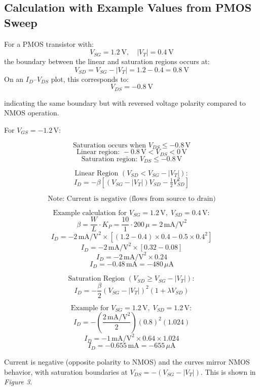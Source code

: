 \documentclass[a4paper,12pt]{article}
\begin{document}
\subsection*{Calculation with Example Values from PMOS Sweep}
For a PMOS transistor with:
\[
V_{SG} = 1.2~\text{V}, \quad |V_T| = 0.4~\text{V}
\]
the boundary between the linear and saturation regions occurs at:
\[
V_{SD} = V_{SG} - |V_T| = 1.2 - 0.4 = 0.8~\text{V}
\]
On an $I_D$--$V_{DS}$ plot, this corresponds to:
\[
V_{DS} = -0.8~\text{V}
\]

indicating the same boundary but with reversed voltage polarity compared to NMOS operation.

For \( V_{GS} = -1.2\,\text{V} \):

\[
\text{Saturation occurs when } V_{DS} \le -0.8\,\text{V}
\]
\[
\text{Linear region: } -0.8\,\text{V} < V_{DS} < 0\,\text{V}
\]
\[
\text{Saturation region: } V_{DS} \le -0.8\,\text{V}
\]

\[
\text{Linear Region } (V_{SD} < V_{SG} - |V_T|):
\]
\[
I_D = -\beta\left[(V_{SG} - |V_T|)V_{SD} - \tfrac{1}{2}V_{SD}^2\right]
\]

\[
\text{Note: Current is negative (flows from source to drain)}
\]

\[
\text{Example calculation for } V_{SG} = 1.2\,\text{V}, \; V_{SD} = 0.4\,\text{V}:
\]
\[
\beta = \frac{W}{L} \cdot K_P = \frac{10}{1} \cdot 200\,\mu = 2\,\text{mA/V}^2
\]
\[
I_D = -2\,\text{mA/V}^2 \times \left[(1.2 - 0.4)\times0.4 - 0.5\times0.4^2\right]
\]
\[
I_D = -2\,\text{mA/V}^2 \times [0.32 - 0.08]
\]
\[
I_D = -2\,\text{mA/V}^2 \times 0.24
\]
\[
I_D = -0.48\,\text{mA} = -480\,\mu\text{A}
\]

\[
\text{Saturation Region } (V_{SD} \ge V_{SG} - |V_T|):
\]
\[
I_D = -\frac{\beta}{2}(V_{SG} - |V_T|)^2(1 + \lambda V_{SD})
\]

\[
\text{Example for } V_{SG} = 1.2\,\text{V}, \; V_{SD} = 1.2\,\text{V}:
\]
\[
I_D = -\left(\frac{2\,\text{mA/V}^2}{2}\right) (0.8)^2 (1.024)
\]
\[
I_D = -1\,\text{mA/V}^2 \times 0.64 \times 1.024
\]
\[
I_D = -0.655\,\text{mA} = -655\,\mu\text{A}
\]

Current is negative (opposite polarity to NMOS) and the curves mirror NMOS behavior, with saturation boundaries at $V_{DS} = -(V_{SG} - |V_T|)$.
This is shown in \textit{Figure 3}.

\newpage
\end{document}
